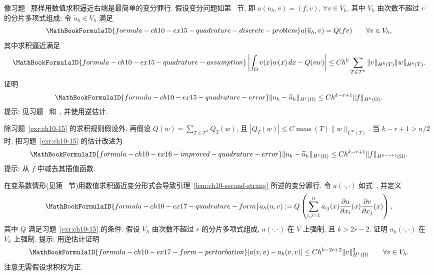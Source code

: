 \begin{MBExercise}
\label{exr:ch10-15}
像习题~ 那样用数值求积逼近右端是最简单的变分罪行. 假设变分问题如第~ 节, 即 $a(u_h,v)=(f,v)$, $\forall v\in V_h$, 其中 $V_h$ 由次数不超过 $r$ 的分片多项式组成; 令 $\widetilde u_h\in V_h$ 满足
\[
\MathBookFormulaID{formula-ch10-ex15-quadrature-discrete-problem}
a(\widetilde u_h,v)=Q(fv)\qquad\forall v\in V_h,
\]
其中求积逼近满足
\[
\MathBookFormulaID{formula-ch10-ex15-quadrature-assumption}
\left|\int_\Omega v(x)w(x)\,dx-Q(vw)\right|
\leq Ch^k\sum_{T\in\mathcal T^h}\|v\|_{H^k(T)}\|w\|_{H^k(T)}.
\]
证明
\[
\MathBookFormulaID{formula-ch10-ex15-quadrature-error}
\|u_h-\widetilde u_h\|_{H^1(\Omega)}
\leq Ch^{k-r+1}\|f\|_{H^k(\Omega)}.
\]
提示: 见习题~ 和~, 并使用逆估计.
\end{MBExercise}

\begin{MBExercise}
\label{exr:ch10-16}
除习题~\ref{exr:ch10-15} 的求积规则假设外, 再假设 $Q(w)=\sum_{T\in\mathcal T^h}Q_T(w)$, 且 $|Q_T(w)|\leq C\operatorname{meas}(T)\|w\|_{L^\infty(T)}$. 当 $k-r+1>n/2$ 时, 把习题~\ref{exr:ch10-15} 的估计改进为
\[
\MathBookFormulaID{formula-ch10-ex16-improved-quadrature-error}
\|u_h-\widetilde u_h\|_{H^1(\Omega)}
\leq Ch^{k-r+1}\|f\|_{H^{k-r+1}(\Omega)}.
\]
提示: 从 $f$ 中减去其插值函数.
\end{MBExercise}

\begin{MBExercise}
\label{exr:ch10-17}
在变系数情形(见第~ 节)用数值求积逼近变分形式会导致引理~\ref{lem:ch10-second-strang} 所述的变分罪行. 令 $a(\cdot,\cdot)$ 如式~, 并定义
\[
\MathBookFormulaID{formula-ch10-ex17-quadrature-form}
a_h(u,v):=Q\left(\sum_{i,j=1}^na_{ij}(x)
\frac{\partial u}{\partial x_i}(x)\frac{\partial v}{\partial x_j}(x)\right),
\]
其中 $Q$ 满足习题~\ref{exr:ch10-15} 的条件. 假设 $V_h$ 由次数不超过 $r$ 的分片多项式组成, $a(\cdot,\cdot)$ 在 $V$ 上强制, 且 $k>2r-2$. 证明 $a_h(\cdot,\cdot)$ 在 $V_h$ 上强制. 提示: 用逆估计证明
\[
\MathBookFormulaID{formula-ch10-ex17-form-perturbation}
|a(v,v)-a_h(v,v)|\leq Ch^{k-2r+2}\|v\|_{H^1(\Omega)}^2
\qquad\forall v\in V_h.
\]
注意无需假设求积权为正.
\end{MBExercise}

